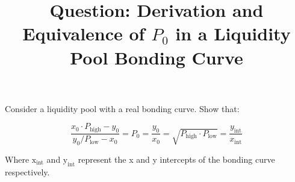 \documentclass{article}
\begin{document}
\title{Question: Derivation and Equivalence of \( P_0 \) in a Liquidity Pool Bonding Curve}
\author{}
\date{}
\maketitle

Consider a liquidity pool with a real bonding curve. Show that:

\[ \frac{x_0 \cdot P_{\text{high}} - y_0}{y_0 / P_{\text{low}} - x_0} = P_0 = \frac{y_0}{x_0} = \sqrt{P_{\text{high}} \cdot P_{\text{low}}} = \frac{y_{\text{int}}}{x_{\text{int}}} \]

Where \( \text{x}_{\text{int}} \) and \( \text{y}_{\text{int}} \) represent the x and y intercepts of the bonding curve respectively.
\end{document}
